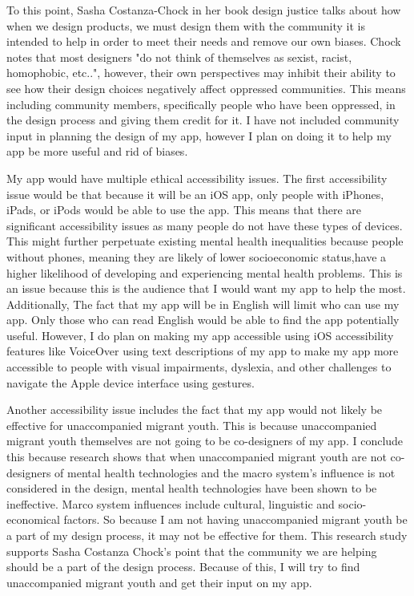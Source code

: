 \documentclass[12pt,twocolumn]{article}
\begin{document}
To this point, Sasha Costanza-Chock in her book design justice talks about how when we design products, we must design them with the community it is intended to help in order to meet their needs and remove our own biases\cite{Chock20}. Chock notes that most designers "do not think of themselves as sexist, racist, homophobic, etc..", however, their own perspectives may inhibit their ability to see how their design choices negatively affect oppressed communities\cite{Chock20}. This means including community members, specifically people who have been oppressed, in the design process and giving them credit for it. I have not included community input in planning the design of my app, however I plan on doing it to help my app be more useful and rid of biases.

My app would have multiple ethical accessibility issues. The first accessibility issue would be that because it will be an iOS app, only people with iPhones, iPads, or iPods would be able to use the app. This means that there are significant accessibility issues as many people do not have these types of devices. This might further perpetuate existing mental health inequalities because people without phones, meaning they are likely of lower socioeconomic status,have a higher likelihood of developing and experiencing mental health problems\cite{WHO14}. This is an issue because this is the audience that I would want my app to help the most. Additionally, The fact that my app will be in English will limit who can use my app. Only those who can read English would be able to find the app potentially useful. However, I do plan on making my app accessible using iOS accessibility features like VoiceOver using text descriptions of my app to make my app more accessible to people with visual impairments, dyslexia, and other challenges to navigate the Apple device interface using gestures. 


Another accessibility issue includes the fact that my app would not likely be effective for unaccompanied migrant youth. This is because unaccompanied migrant youth themselves are not going to be co-designers of my app. I conclude this because research shows that when unaccompanied migrant youth are not co-designers of mental health technologies and the macro system’s influence is not considered in the design, mental health technologies have been shown to be ineffective\cite{Tachtler21}. Marco system influences include cultural, linguistic and socio-economical factors. So because I am not having unaccompanied migrant youth be a part of my design process, it may not be effective for them. This research study supports Sasha Costanza Chock’s point that the community we are helping should be a part of the design process\cite{Chock20}. Because of this, I will try to find unaccompanied migrant youth and get their input on my app.
\end{document}
